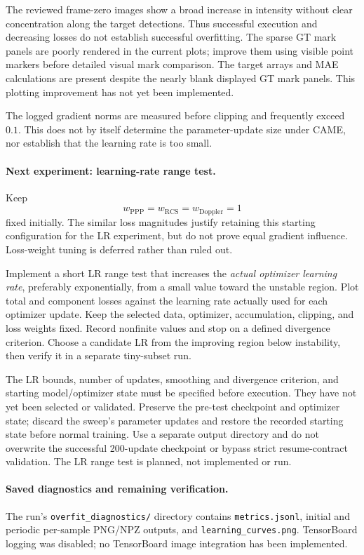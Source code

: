 \documentclass[11pt,a4paper]{article}
\begin{document}
The reviewed frame-zero images show a broad increase in intensity
without clear concentration along the target detections. Thus successful
execution and decreasing losses do not establish successful overfitting.
The sparse GT mark panels are poorly rendered in the current plots;
improve them using visible point markers before detailed visual mark
comparison. The target arrays and MAE calculations are present despite
the nearly blank displayed GT mark panels. This plotting improvement
has not yet been implemented.

The logged gradient norms are measured before clipping and frequently
exceed $0.1$. This does not by itself determine the parameter-update size
under CAME, nor establish that the learning rate is too small.

\paragraph{Next experiment: learning-rate range test.}
Keep
\[
    w_{\mathrm{PPP}}=w_{\mathrm{RCS}}=w_{\mathrm{Doppler}}=1
\]
fixed initially. The similar loss magnitudes justify retaining this
starting configuration for the LR experiment, but do not prove equal
gradient influence. Loss-weight tuning is deferred rather than ruled out.

Implement a short LR range test that increases the \emph{actual optimizer
learning rate}, preferably exponentially, from a small value toward the
unstable region. Plot total and component losses against the learning
rate actually used for each optimizer update. Keep the selected data,
optimizer, accumulation, clipping, and loss weights fixed. Record
nonfinite values and stop on a defined divergence criterion. Choose a
candidate LR from the improving region below instability, then verify
it in a separate tiny-subset run.

The LR bounds, number of updates, smoothing and divergence criterion,
and starting model/optimizer state must be specified before execution.
They have not yet been selected or validated. Preserve the pre-test
checkpoint and optimizer state; discard the sweep's parameter updates
and restore the recorded starting state before normal training.
Use a separate output directory and do not overwrite the successful
200-update checkpoint or bypass strict resume-contract validation.
The LR range test is planned, not implemented or run.

\paragraph{Saved diagnostics and remaining verification.}
The run's \texttt{overfit\_diagnostics/} directory contains
\texttt{metrics.jsonl}, initial and periodic per-sample PNG/NPZ outputs,
and \texttt{learning\_curves.png}. TensorBoard logging was disabled;
no TensorBoard image integration has been implemented.
\end{document}
